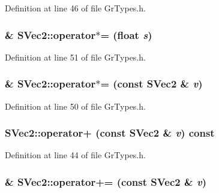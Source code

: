 Definition at line 46 of file GrTypes.h.\hypertarget{struct_s_vec2_c9e6e56e4780c65ae64f49ec689b7b6a}{
\subsubsection[{operator$\ast$=}]{\& SVec2::operator$\ast$= (float {\em s})}}
\label{struct_s_vec2_c9e6e56e4780c65ae64f49ec689b7b6a}




Definition at line 51 of file GrTypes.h.\hypertarget{struct_s_vec2_6233442ec43cd512a137c4f531602832}{
\subsubsection[{operator$\ast$=}]{\& SVec2::operator$\ast$= (const {\bf SVec2} \& {\em v})}}
\label{struct_s_vec2_6233442ec43cd512a137c4f531602832}




Definition at line 50 of file GrTypes.h.\hypertarget{struct_s_vec2_25becdef04d3c9b6b626cf28e6436bed}{
\subsubsection[{operator+}]{ SVec2::operator+ (const {\bf SVec2} \& {\em v}) const}}
\label{struct_s_vec2_25becdef04d3c9b6b626cf28e6436bed}




Definition at line 44 of file GrTypes.h.\hypertarget{struct_s_vec2_da3d0dc973d5592451407e89de3570a5}{
\subsubsection[{operator+=}]{\& SVec2::operator+= (const {\bf SVec2} \& {\em v})}}
\label{struct_s_vec2_da3d0dc973d5592451407e89de3570a5}





